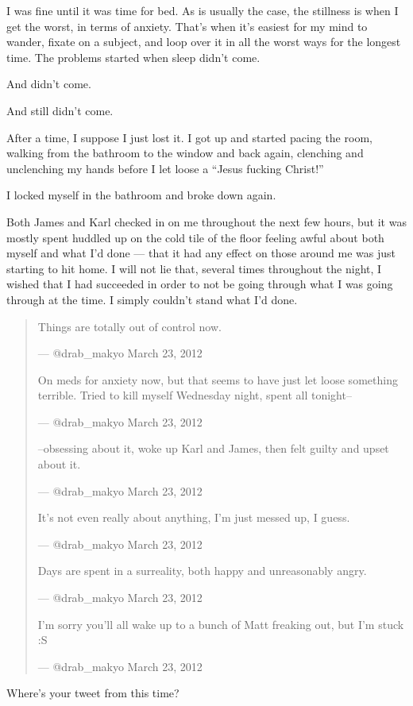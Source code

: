 I was fine until it was time for bed. As is usually the case, the stillness is when I get the worst, in terms of anxiety. That's when it's easiest for my mind to wander, fixate on a subject, and loop over it in all the worst ways for the longest time. The problems started when sleep didn't come.

And didn't come.

And still didn't come.

After a time, I suppose I just lost it. I got up and started pacing the room, walking from the bathroom to the window and back again, clenching and unclenching my hands before I let loose a ``Jesus fucking Christ!''

I locked myself in the bathroom and broke down again.

Both James and Karl checked in on me throughout the next few hours, but it was mostly spent huddled up on the cold tile of the floor feeling awful about both myself and what I'd done --- that it had any effect on those around me was just starting to hit home. I will not lie that, several times throughout the night, I wished that I had succeeded in order to not be going through what I was going through at the time. I simply couldn't stand what I'd done.
\newpage

\begin{quotation}
  Things are totally out of control now.

--- @drab\_makyo March 23, 2012

On meds for anxiety now, but that seems to have just let loose something terrible. Tried to kill myself Wednesday night, spent all tonight--

--- @drab\_makyo March 23, 2012

--obsessing about it, woke up Karl and James, then felt guilty and upset about it.

--- @drab\_makyo March 23, 2012

It's not even really about anything, I'm just messed up, I guess.

--- @drab\_makyo March 23, 2012

Days are spent in a surreality, both happy and unreasonably angry.

--- @drab\_makyo March 23, 2012

I'm sorry you'll all wake up to a bunch of Matt freaking out, but I'm stuck :S

--- @drab\_makyo March 23, 2012
\end{quotation}

\begin{ally}
Where's your tweet from this time?
\end{ally}

